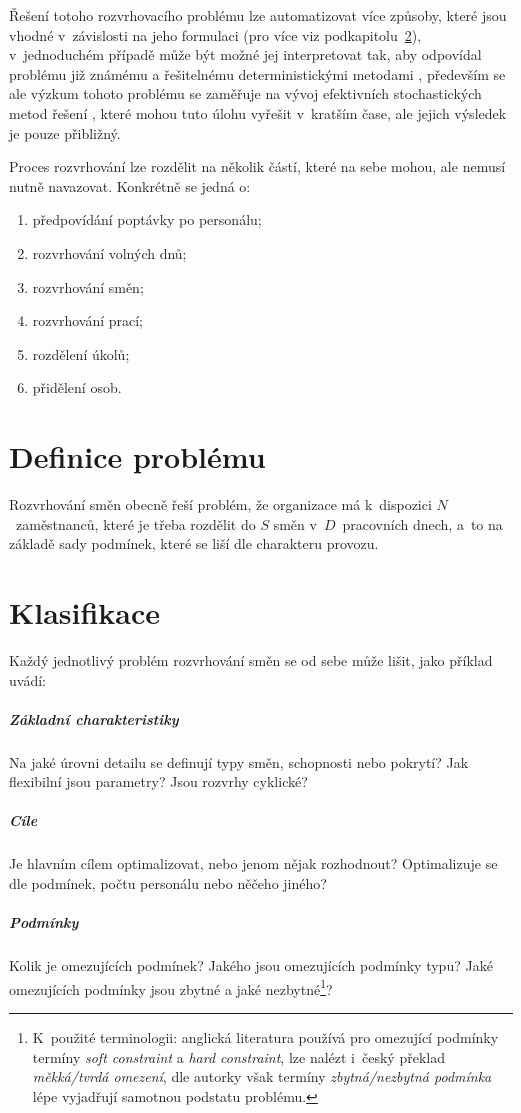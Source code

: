 \documentclass[twoside]{ctuthesis}
\begin{document}
Řešení totoho rozvrhovacího problému lze automatizovat více způsoby, které jsou vhodné v~závislosti na jeho formulaci (pro více viz podkapitolu~\ref{sec:clasif}), v~jednoduchém případě může být možné jej interpretovat tak, aby odpovídal problému již známému a řešitelnému deterministickými metodami \cite{blochliger2004modeling}, především se ale výzkum tohoto problému se zaměřuje na vývoj efektivních stochastických metod řešení \cite{adamuthe2012tabu}, které mohou tuto úlohu vyřešit v~kratším čase, ale jejich výsledek je pouze přibližný.

Proces rozvrhování lze rozdělit na několik částí, které na sebe mohou, ale nemusí nutně navazovat. \cite{ernst2004staff} Konkrétně se jedná o:
\begin{enumerate}
	\item předpovídání poptávky po personálu;
	\item rozvrhování volných dnů;
	\item rozvrhování směn;
	\item rozvrhování prací;
	\item rozdělení úkolů;
	\item přidělení osob.
\end{enumerate}

\section{Definice problému}

Rozvrhování směn obecně řeší problém, že organizace má k~dispozici $N$~zaměstnanců, které je třeba rozdělit do $S$ směn v~$D$~pracovních dnech, a~to na základě sady podmínek, které se liší dle charakteru provozu.

\section{Klasifikace}
\label{sec:clasif}

Každý jednotlivý problém rozvrhování směn se od sebe může lišit, \cite{de2011categorisation} jako příklad uvádí:

\subparagraph{Základní charakteristiky}
Na jaké úrovni detailu se definují typy směn, schopnosti nebo pokrytí? Jak flexibilní jsou parametry? Jsou rozvrhy cyklické?

\subparagraph{Cíle}
Je hlavním cílem optimalizovat, nebo jenom nějak rozhodnout? Optimalizuje se dle podmínek, počtu personálu nebo něčeho jiného?

\subparagraph{Podmínky}
Kolik je omezujících podmínek? Jakého jsou omezujících podmínky typu? Jaké omezujících podmínky jsou zbytné a jaké nezbytné\footnote{K~použité terminologii: anglická literatura používá pro omezující podmínky termíny \textit{soft constraint} a \textit{hard constraint}, lze nalézt i~český překlad \textit{měkká/tvrdá omezení}, dle autorky však termíny \textit{zbytná/nezbytná podmínka} lépe vyjadřují samotnou podstatu problému.}?
\end{document}
